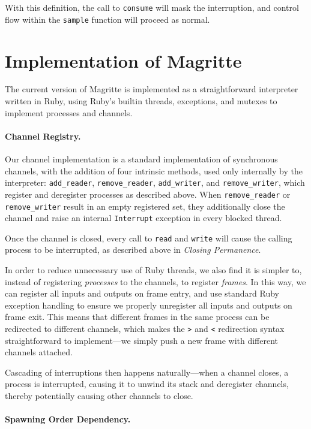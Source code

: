 \documentclass[english,preprint,JIP]{ipsj}
\begin{document}
With this definition, the call to \verb/consume/ will mask the interruption, and control flow within the \verb/sample/ function will proceed as normal.

\section{Implementation of Magritte}

The current version of Magritte is implemented as a straightforward interpreter written in Ruby, using Ruby's builtin threads, exceptions, and mutexes to implement processes and channels.

\paragraph{Channel Registry.}

Our channel implementation is a standard implementation of synchronous channels, with the addition of four intrinsic methods, used only internally by the interpreter: \verb/add_reader/, \verb/remove_reader/, \verb/add_writer/, and \verb/remove_writer/, which register and deregister processes as described above. When \verb/remove_reader/ or \verb/remove_writer/ result in an empty registered set, they additionally close the channel and raise an internal \verb/Interrupt/ exception in every blocked thread.

Once the channel is closed, every call to \verb/read/ and \verb/write/ will cause the calling process to be interrupted, as described above in \emph{Closing Permanence}.

In order to reduce unnecessary use of Ruby threads, we also find it is simpler to, instead of registering \emph{processes} to the channels, to register \emph{frames}. In this way, we can register all inputs and outputs on frame entry, and use standard Ruby exception handling to ensure we properly unregister all inputs and outputs on frame exit. This means that different frames in the same process can be redirected to different channels, which makes the \verb/>/ and \verb/</ redirection syntax straightforward to implement---we simply push a new frame with different channels attached.

Cascading of interruptions then happens naturally---when a channel closes, a process is interrupted, causing it to unwind its stack and deregister channels, thereby potentially causing other channels to close.

\paragraph{Spawning Order Dependency.}
\end{document}
